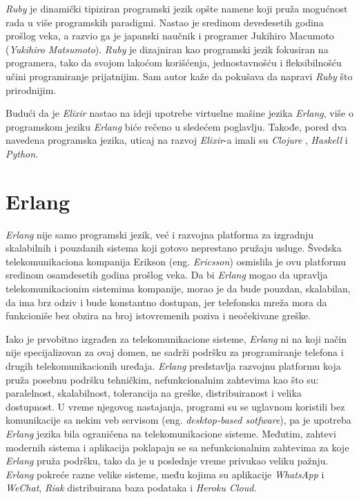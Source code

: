\documentclass[12pt,oneside]{memoir}
\begin{document}
\emph{Ruby} je dinamički tipiziran programski jezik opšte namene koji pruža mogućnost rada u više
programskih paradigmi. Nastao je sredinom devedesetih godina prošlog veka, a razvio ga je 
japanski naučnik i programer Jukihiro Macumoto (\emph{Yukihiro Matsumoto}). \emph{Ruby} je dizajniran
kao programski jezik fokusiran na programera, tako da svojom lakoćom korišćenja, jednostavnošću i 
fleksibilnošću učini programiranje prijatnijim. Sam autor kaže da pokušava da napravi \emph{Ruby} 
što prirodnijim.  

Budući da je \emph{Elixir} nastao na ideji upotrebe virtuelne mašine jezika \emph{Erlang}, više o programskom jeziku \emph{Erlang} biće rečeno
u sledećem poglavlju. Takođe, pored dva navedena programska jezika, uticaj na razvoj \emph{Elixir}-a 
imali su \emph{Clojure} \cite{clojure}, \emph{Haskell}\cite{haskell} i \emph{Python}\cite{python}.

\section{Erlang}
\emph{Erlang} nije samo programski jezik, već i razvojna platforma za izgradnju skalabilnih i pouzdanih
sistema koji gotovo neprestano pružaju usluge. Švedska telekomunikaciona kompanija Erikson (eng.
\emph{Ericsson}) osmislila je ovu platformu sredinom  osamdesetih godina prošlog veka. 
Da bi \emph{Erlang} mogao da upravlja telekomunikacionim sistemima kompanije, morao
je da bude pouzdan, skalabilan, da ima brz odziv i bude konstantno dostupan, jer telefonska mreža
mora da funkcioniše bez obzira na broj istovremenih poziva i neočekivane greške.

Iako je prvobitno izgrađen za telekomunikacione sisteme, \emph{Erlang} ni na koji način nije 
specijalizovan za ovaj domen, ne sadrži podršku za programiranje telefona i drugih 
telekomunikacionih uređaja. \emph{Erlang} predstavlja razvojnu platformu koja pruža posebnu podršku
tehničkim, nefunkcionalnim zahtevima kao što su: paralelnost, skalabilnost, tolerancija na
greške, distribuiranost i velika dostupnost. U vreme njegovog nastajanja, programi su se uglavnom
koristili bez komunikacije sa nekim veb servisom (eng. \emph{desktop-based sotfware}), pa je 
upotreba \emph{Erlang} jezika bila ograničena na telekomunikacione sisteme. Međutim, zahtevi modernih 
sistema i aplikacija poklapaju se sa nefunkcionalnim zahtevima za koje \emph{Erlang} pruža podršku, tako
da je u poslednje vreme privukao veliku pažnju. \emph{Erlang} pokreće razne velike sisteme, među kojima
su aplikacije \emph{WhatsApp}\cite{whatsapp} i \emph{WeChat}\cite{wechat}, \emph{Riak}\cite{riak}  
distribuirana baza podataka i \emph{Heroku Cloud}\cite{heroku}.
\end{document}
